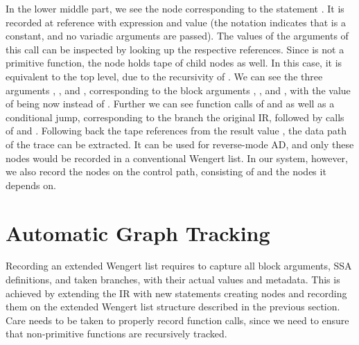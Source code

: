 In the lower middle part, we see the node corresponding to the statement .  It is recorded at reference  with expression  and value
 (the notation  indicates that  is a constant, and
no variadic arguments are passed). The values of the arguments of this call can be inspected by
looking up the respective references.  Since  is not a primitive function, the node
holds tape of child nodes as well.  In this case, it is equivalent to the top level, due to the
recursivity of . We can see the three arguments , , and ,
corresponding to the block arguments , , and , with the value of
 being now  instead of .  Further we can see function calls of
 and \jlinl{<} as well as a conditional jump, corresponding to the branch the original
IR, followed by calls of \jlinl{+} and . Following back the tape references from the
result value , the data path of the trace can be extracted.  It can be used for
reverse-mode AD, and only these nodes would be recorded in a conventional Wengert list.  In our
system, however, we also record the nodes on the control path, consisting of  and the
nodes it depends on.


\section{Automatic Graph Tracking}
\label{sec:autom-graph-track}

Recording an extended Wengert list requires to capture all block arguments, SSA definitions, and
taken branches, with their actual values and metadata. This is achieved by extending the IR with new
statements creating nodes and recording them on the extended Wengert list structure described in the
previous section. Care needs to be taken to properly record function calls, since we need to ensure
that non-primitive functions are recursively tracked.

